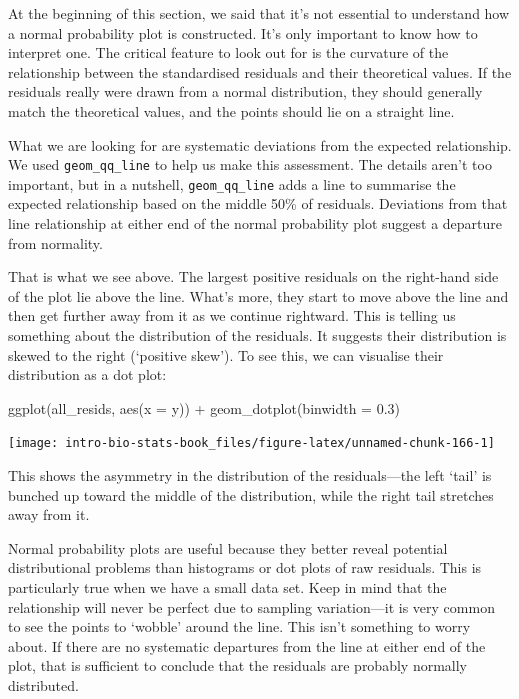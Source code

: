 \documentclass[
]{book}
\newenvironment{Shaded}{\begin{snugshade}}{\end{snugshade}}
\newcommand{\AttributeTok}[1]{\textcolor[rgb]{0.77,0.63,0.00}{#1}}
\newcommand{\FloatTok}[1]{\textcolor[rgb]{0.00,0.00,0.81}{#1}}
\newcommand{\FunctionTok}[1]{\textcolor[rgb]{0.00,0.00,0.00}{#1}}
\newcommand{\NormalTok}[1]{#1}
\newcommand{\SpecialCharTok}[1]{\textcolor[rgb]{0.00,0.00,0.00}{#1}}
\begin{document}
At the beginning of this section, we said that it's not essential to understand how a normal probability plot is constructed. It's only important to know how to interpret one. The critical feature to look out for is the curvature of the relationship between the standardised residuals and their theoretical values. If the residuals really were drawn from a normal distribution, they should generally match the theoretical values, and the points should lie on a straight line.

What we are looking for are systematic deviations from the expected relationship. We used \texttt{geom\_qq\_line} to help us make this assessment. The details aren't too important, but in a nutshell, \texttt{geom\_qq\_line} adds a line to summarise the expected relationship based on the middle 50\% of residuals. Deviations from that line relationship at either end of the normal probability plot suggest a departure from normality.

That is what we see above. The largest positive residuals on the right-hand side of the plot lie above the line. What's more, they start to move above the line and then get further away from it as we continue rightward. This is telling us something about the distribution of the residuals. It suggests their distribution is skewed to the right (`positive skew'). To see this, we can visualise their distribution as a dot plot:

\begin{Shaded}
\begin{Highlighting}[]
\FunctionTok{ggplot}\NormalTok{(all\_resids, }\FunctionTok{aes}\NormalTok{(}\AttributeTok{x =}\NormalTok{ y)) }\SpecialCharTok{+} 
  \FunctionTok{geom\_dotplot}\NormalTok{(}\AttributeTok{binwidth =} \FloatTok{0.3}\NormalTok{)}
\end{Highlighting}
\end{Shaded}

\begin{center}\texttt{[image: intro-bio-stats-book\_files/figure-latex/unnamed-chunk-166-1]} \end{center}

This shows the asymmetry in the distribution of the residuals---the left `tail' is bunched up toward the middle of the distribution, while the right tail stretches away from it.

Normal probability plots are useful because they better reveal potential distributional problems than histograms or dot plots of raw residuals. This is particularly true when we have a small data set. Keep in mind that the relationship will never be perfect due to sampling variation---it is very common to see the points to `wobble' around the line. This isn't something to worry about. If there are no systematic departures from the line at either end of the plot, that is sufficient to conclude that the residuals are probably normally distributed.
\end{document}
